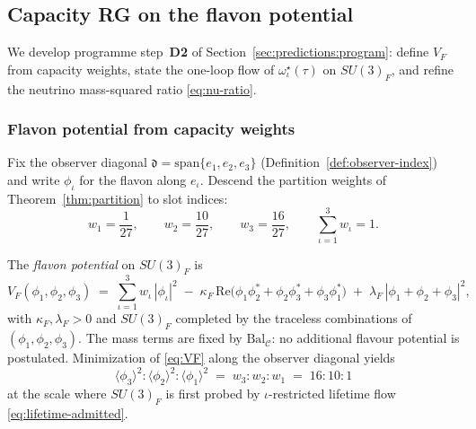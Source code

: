 \subsection{Capacity RG on the flavon potential}
\label{sec:physics:flavon-rg}

We develop programme step~\textbf{D2} of Section~\ref{sec:predictions:program}:
define $V_F$ from capacity weights, state the one-loop flow of
$\omega^\star_\iota(\tau)$ on $SU(3)_F$, and refine the neutrino mass-squared
ratio \eqref{eq:nu-ratio}.

\subsubsection{Flavon potential from capacity weights}

Fix the observer diagonal $\mathfrak{d}=\mathrm{span}\{e_1,e_2,e_3\}$
(Definition~\ref{def:observer-index}) and write $\phi_\iota$ for the flavon
along $e_\iota$. Descend the partition weights of Theorem~\ref{thm:partition} to
slot indices:
\begin{equation}\label{eq:flavon-weights}
  w_1=\frac{1}{27},\qquad w_2=\frac{10}{27},\qquad w_3=\frac{16}{27},
  \qquad \sum_{\iota=1}^3 w_\iota=1.
\end{equation}

\begin{definition}\label{def:flavon-potential}
The \emph{flavon potential} on $SU(3)_F$ is
\begin{equation}\label{eq:VF}
  V_F(\phi_1,\phi_2,\phi_3)
  \;=\;
  \sum_{\iota=1}^3 w_\iota\,|\phi_\iota|^2
  \;-\;
  \kappa_F\,\mathrm{Re}\!\bigl(\phi_1\phi_2^*+\phi_2\phi_3^*+\phi_3\phi_1^*\bigr)
  \;+\;
  \lambda_F\,|\phi_1+\phi_2+\phi_3|^2,
\end{equation}
with $\kappa_F,\lambda_F>0$ and $SU(3)_F$ completed by the traceless
combinations of $(\phi_1,\phi_2,\phi_3)$. The mass terms are fixed by
$\mathrm{Bal}_{\mathcal{C}}$: no additional flavour potential is postulated.
Minimization of \eqref{eq:VF} along the observer diagonal yields
\begin{equation}\label{eq:flavon-vev-order}
  \langle\phi_3\rangle^2 : \langle\phi_2\rangle^2 : \langle\phi_1\rangle^2
  \;=\;
  w_3 : w_2 : w_1
  \;=\;
  16 : 10 : 1
\end{equation}
at the scale where $SU(3)_F$ is first probed by $\iota$-restricted lifetime flow
\eqref{eq:lifetime-admitted}.
\end{definition}

